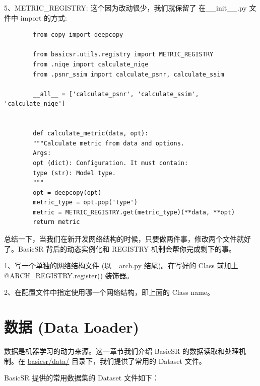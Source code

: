 \documentclass[../main.tex]{subfiles}
\begin{document}
	5、METRIC\_REGISTRY: 这个因为改动很少，我们就保留了 在\_\_init\_\_.py 文件中 import 的方式:
	\begin{verbatim}
		from copy import deepcopy
		
		from basicsr.utils.registry import METRIC_REGISTRY
		from .niqe import calculate_niqe
		from .psnr_ssim import calculate_psnr, calculate_ssim
		
		__all__ = ['calculate_psnr', 'calculate_ssim', 'calculate_niqe']
		
		
		def calculate_metric(data, opt):
		"""Calculate metric from data and options.
		Args:
		opt (dict): Configuration. It must contain:
		type (str): Model type.
		"""
		opt = deepcopy(opt)
		metric_type = opt.pop('type')
		metric = METRIC_REGISTRY.get(metric_type)(**data, **opt)
		return metric
	\end{verbatim}
	
	总结一下，当我们在新开发网络结构的时候，只要做两件事，修改两个文件就好了。BasicSR 背后的动态实例化和 REGISTRY 机制会帮你完成剩下的事。
	
	1、写一个单独的网络结构文件 (以 \_arch.py 结尾)。在写好的 Class 前加上 @ARCH\_REGISTRY.register() 装饰器。
	
	2、在配置文件中指定使用哪一个网络结构，即上面的 Class name。
	
	
	
	
	\section{数据 (Data Loader)}
	数据是机器学习的动力来源。这一章节我们介绍 BasicSR 的数据读取和处理机制。在 \href{https://github.com/XPixelGroup/BasicSR/tree/master/basicsr/data}{basicsr/data/} 目录下，我们提供了常用的 Dataset 文件。
	
	
	BasicSR 提供的常用数据集的 Dataset 文件如下：
	
\end{document}
